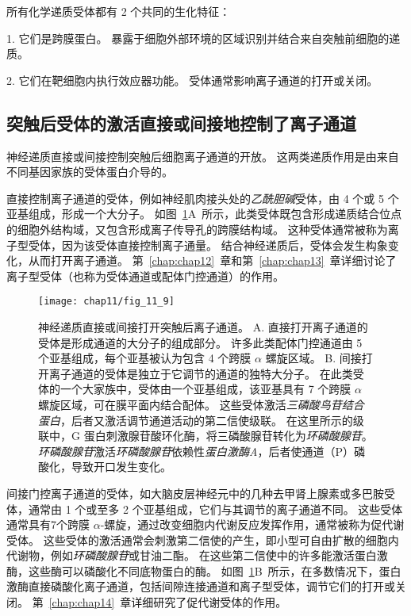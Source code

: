 所有化学递质受体都有 2 个共同的生化特征：

1. 它们是跨膜蛋白。
暴露于细胞外部环境的区域识别并结合来自突触前细胞的递质。


2. 它们在靶细胞内执行效应器功能。
受体通常影响离子通道的打开或关闭。



\subsection{突触后受体的激活直接或间接地控制了离子通道}

神经递质直接或间接控制突触后细胞离子通道的开放。
这两类递质作用是由来自不同基因家族的受体蛋白介导的。


直接控制离子通道的受体，例如神经肌肉接头处的\textit{乙酰胆碱}受体，由 4 个或 5 个亚基组成，形成一个大分子。
如图~\ref{fig:11_9}A~所示，此类受体既包含形成递质结合位点的细胞外结构域，又包含形成离子传导孔的跨膜结构域。
这种受体通常被称为离子型受体，因为该受体直接控制离子通量。
结合神经递质后，受体会发生构象变化，从而打开离子通道。
第~\ref{chap:chap12}~章和第~\ref{chap:chap13}~章详细讨论了离子型受体（也称为受体通道或配体门控通道）的作用。


\begin{figure}[htbp]
	\centering
	\texttt{[image: chap11/fig\_11\_9]}
	\caption{神经递质直接或间接打开突触后离子通道。
		A. 直接打开离子通道的受体是形成通道的大分子的组成部分。
		许多此类配体门控通道由 5 个亚基组成，每个亚基被认为包含 4 个跨膜 $\alpha$ 螺旋区域。
		B. 间接打开离子通道的受体是独立于它调节的通道的独特大分子。
		在此类受体的一个大家族中，受体由一个亚基组成，该亚基具有 7 个跨膜 $\alpha$ 螺旋区域，可在膜平面内结合配体。
		这些受体激活\textit{三磷酸鸟苷结合蛋白}，后者又激活调节通道活动的第二信使级联。
		在这里所示的级联中，G 蛋白刺激腺苷酸环化酶，将三磷酸腺苷转化为\textit{环磷酸腺苷}。
		\textit{环磷酸腺苷}激活\textit{环磷酸腺苷}依赖性\textit{蛋白激酶A}，后者使通道（P）磷酸化，导致开口发生变化。}
	\label{fig:11_9}
\end{figure}


间接门控离子通道的受体，如大脑皮层神经元中的几种去甲肾上腺素或多巴胺受体，通常由 1 个或至多 2 个亚基组成，它们与其调节的离子通道不同。
这些受体通常具有7个跨膜 $\alpha$-螺旋，通过改变细胞内代谢反应发挥作用，通常被称为促代谢受体。
这些受体的激活通常会刺激第二信使的产生，即小型可自由扩散的细胞内代谢物，例如\textit{环磷酸腺苷}或甘油二酯。
在这些第二信使中的许多能激活蛋白激酶，这些酶可以磷酸化不同底物蛋白的酶。
如图~\ref{fig:11_9}B~所示，在多数情况下，蛋白激酶直接磷酸化离子通道，包括间隙连接通道和离子型受体，调节它们的打开或关闭。
第~\ref{chap:chap14}~章详细研究了促代谢受体的作用。


